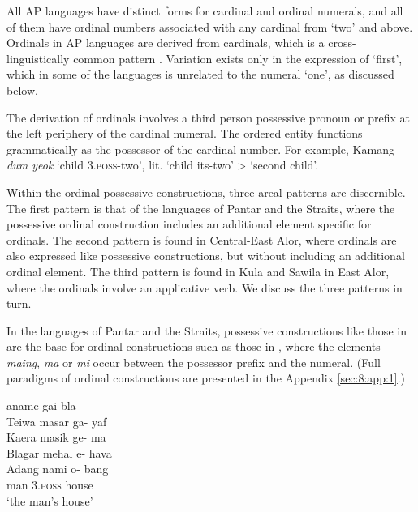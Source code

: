 All AP languages have distinct forms for cardinal and ordinal numerals, and all of them have ordinal numbers associated with any cardinal from `two' and above. Ordinals in AP languages are derived from cardinals, which is a cross-linguistically common pattern \citep{StolzEtAl2013}. Variation exists only in the expression of `first', which in some of the languages is unrelated to the numeral `one', as discussed below. 

The derivation of ordinals involves a third person possessive pronoun or prefix at the left periphery of the cardinal numeral. The ordered entity functions grammatically as the possessor of the cardinal number. For example, Kamang \textit{dum yeok} `child 3.\textsc{poss}{}-two', lit. `child its-two' {\textgreater} `second child'. 

Within the ordinal possessive constructions, three areal patterns are discernible. The first pattern is that of the languages of Pantar and the Straits, where the possessive ordinal construction includes an additional element specific for ordinals. The second pattern is found in Central-East Alor, where ordinals are also expressed like possessive constructions, but without including an additional ordinal element. The third pattern is found in Kula and Sawila in East Alor, where the ordinals involve an applicative verb. We discuss the three patterns in turn.

In the languages of Pantar and the Straits, possessive constructions like those in  are the base for ordinal constructions such as those in , where the elements \textit{maing}, \textit{ma} or \textit{mi} occur between the possessor prefix and the numeral. (Full paradigms of ordinal constructions are presented in the Appendix \ref{sec:8:app:1}.) 


\let\eachwordone=\itshape
\let\eachwordtwo=\itshape
\let\eachwordthree=\itshape
\let\eachwordfour=\itshape
\let\eachwordfive=\itshape 

\ea\label{bkm:Ref342649616}
    aname    gai    bla\\
  {\upshape Teiwa}      masar    ga-    yaf\\
  {\upshape Kaera}      masik    ge-    ma\\
  {\upshape Blagar}      mehal    {\textglotstop}e-    hava\\
  {\upshape Adang}       nami    {\textglotstop}o-    bang\\
   { }        man   \textsc{3.poss}  house  \\
\glt `the man's house'  \\ 
\z

